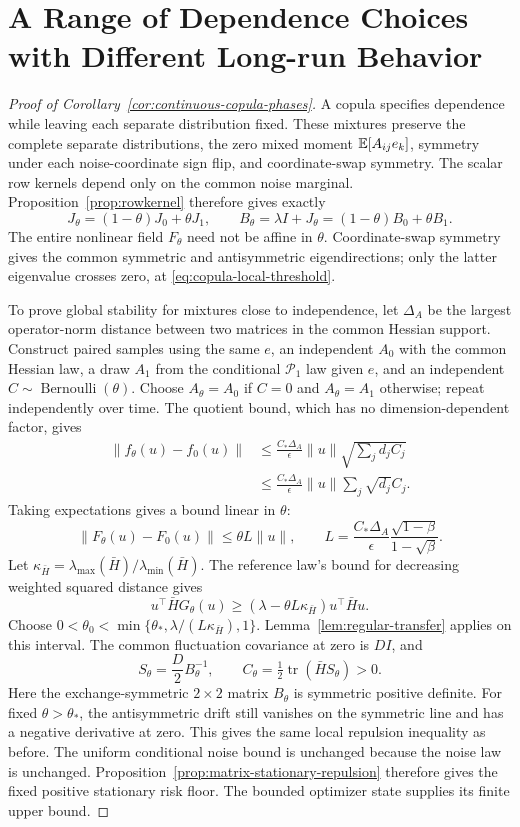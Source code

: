 \section{A Range of Dependence Choices with Different Long-run Behavior}
\label{app:continuous}

\begin{proof}[Proof of Corollary~\ref{cor:continuous-copula-phases}]
A copula specifies dependence while leaving each separate distribution
fixed. These mixtures preserve the complete separate distributions,
the zero mixed moment
$\mathbb E[A_{ij}e_k]$, symmetry under each noise-coordinate sign flip, and coordinate-swap
symmetry.
The scalar row kernels depend only on the common noise marginal.
Proposition~\ref{prop:rowkernel} therefore gives exactly
\[
 J_\theta=(1-\theta)J_0+\theta J_1,
 \qquad B_\theta=\lambda I+J_\theta
              =(1-\theta)B_0+\theta B_1.
\]
The entire nonlinear field $F_\theta$ need not be affine in
$\theta$. Coordinate-swap symmetry gives the common symmetric and
antisymmetric eigendirections; only the latter eigenvalue crosses zero, at
\eqref{eq:copula-local-threshold}.

To prove global stability for mixtures close to independence, let
$\Delta_A$ be the largest operator-norm distance between two matrices in
the common Hessian support. Construct paired samples using
the same $e$, an independent $A_0$ with the common Hessian law, a draw
$A_1$ from the conditional $\mathcal P_1$ law given $e$, and an independent
$C\sim\operatorname{Bernoulli}(\theta)$. Choose $A_\theta=A_0$ if
$C=0$ and $A_\theta=A_1$ otherwise; repeat independently over time.
The quotient bound, which has no dimension-dependent factor, gives
\begin{align*}
 \|f_\theta(u)-f_0(u)\|
 &\leq\frac{C_*\Delta_A}{\epsilon}\|u\|
                   \sqrt{\sum_jd_jC_j}\\
 &\leq\frac{C_*\Delta_A}{\epsilon}\|u\|
                   \sum_j\sqrt{d_j}C_j.
\end{align*}
Taking expectations gives a bound linear in $\theta$:
\[
 \|F_\theta(u)-F_0(u)\|\leq\theta L\|u\|,
 \qquad L=\frac{C_*\Delta_A}{\epsilon}
                      \frac{\sqrt{1-\beta}}{1-\sqrt\beta}.
\]
Let $\kappa_{\bar H}=\lambda_{\max}(\bar H)/\lambda_{\min}(\bar H)$.
The reference law's bound for decreasing weighted squared distance gives
\[
 u^\top\bar HG_\theta(u)
 \geq(\lambda-\theta L\kappa_{\bar H})u^\top\bar Hu.
\]
Choose $0<\theta_0<\min\{\theta_*,\lambda/(L\kappa_{\bar H}),1\}$.
Lemma~\ref{lem:regular-transfer} applies on this interval. The common fluctuation covariance at zero is $DI$, and
\[
 S_\theta=\frac D2B_\theta^{-1},\qquad
 C_\theta=\tfrac12\operatorname{tr}(\bar HS_\theta)>0.
\]
Here the exchange-symmetric $2\times2$ matrix $B_\theta$ is symmetric
positive definite. For fixed $\theta>\theta_*$, the antisymmetric drift
still vanishes on the symmetric line and has a negative derivative at
zero. This gives the same local repulsion inequality as before. The uniform
conditional noise bound is unchanged because the noise law is unchanged. Proposition~\ref{prop:matrix-stationary-repulsion}
therefore gives the fixed positive stationary risk floor. The bounded
optimizer state supplies its finite upper bound.


\end{proof}
